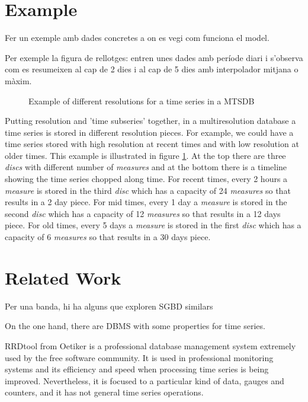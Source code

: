 \documentclass{scrartcl}
\newcommand{\imatges}{../../imatges}
\begin{document}
\section{Example}

Fer un exemple amb dades concretes a on es vegi com funciona el model.

Per exemple la figura de rellotges: entren unes dades amb període diari i s'observa com es resumeixen al cap de 2 dies i al cap de 5 dies amb interpolador mitjana o màxim.



\begin{figure}[tp]
\centering

\caption{Example of different resolutions for a time series in a MTSDB}
\label{fig:model:window}
\end{figure}


Putting resolution and 'time subseries' together, in a multiresolution database a time series is stored in different resolution pieces. For example, we could have a time series stored with high resolution at recent times and with low resolution at older times. This example is illustrated in figure \ref{fig:model:window}. At the top there are three \emph{discs} with different number of \emph{measures} and at the bottom there is a timeline showing the time series chopped along time. For recent times, every 2 hours a \emph{measure} is stored in the third \emph{disc} which has a capacity of 24 \emph{measures} so that results in a 2 day piece. For mid times, every 1 day a  \emph{measure} is stored in the second \emph{disc} which has a capacity of 12 \emph{measures} so that results in a 12 days piece. For old times, every 5 days a  \emph{measure} is stored in the first \emph{disc} which has a capacity of 6 \emph{measures} so that results in a 30 days piece. 


\section{Related Work}




Per una banda, hi ha alguns que exploren SGBD similars

On the one hand, there are DBMS with some properties for time series.

RRDtool from Oetiker \cite{rrdtool} is a professional database
management system extremely used by the free software community. It is
used in professional monitoring systems and its efficiency and speed
when processing time series is being improved. Nevertheless, it is
focused to a particular kind of data, gauges and counters, and it has
not general time series operations.
\end{document}
